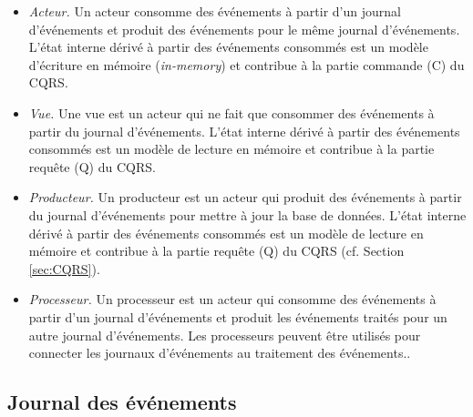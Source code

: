 \begin{itemize}
	\item \textit{Acteur.} Un acteur consomme des événements à partir d'un journal 
	d'événements et produit des événements pour le même journal d'événements. 
	L'état interne dérivé à partir des événements consommés est un modèle 
	d'écriture 
	en mémoire (\textit{in-memory}) et contribue à la partie commande (C) du 
	CQRS.
	\item \textit{Vue.} Une vue est un acteur qui ne fait que consommer des 
	événements à 
	partir du journal d'événements. L'état interne dérivé à partir des événements 
	consommés est un modèle de lecture en mémoire et contribue à la partie 
	requête (Q) du CQRS.
	\item \textit{Producteur.} Un producteur est un acteur qui produit des 
	événements à partir du journal d'événements pour mettre à jour la base 
	de données. L'état interne dérivé à partir des événements consommés est 
	un modèle de lecture en mémoire et 
	contribue à la partie requête (Q) du CQRS (cf. Section \ref{sec:CQRS}).
	\item \textit{Processeur.} Un processeur est un acteur qui consomme des 
	événements à partir d'un journal d'événements et produit les événements 
	traités pour un autre journal d'événements. Les processeurs peuvent être 
	utilisés pour connecter les journaux d'événements au traitement des 
	événements..
\end{itemize}


\subsection{Journal des événements}

